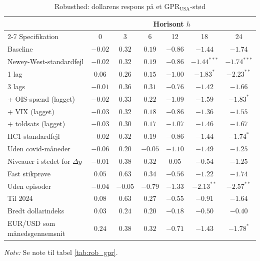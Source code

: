 \begin{table}[H]
\centering
\caption{Robusthed: dollarens respons på et $\text{GPR}_{\text{USA}}$-stød}
\label{tab:rob_gpr_usa}
\begin{threeparttable}
\begin{tabular}{lcccccc}
\toprule
 & \multicolumn{6}{c}{Horisont $h$} \\
\cmidrule(lr){2-7}
Specifikation & 0 & 3 & 6 & 12 & 18 & 24 \\
\midrule
Baseline & $-0.02$ & $0.32$ & $0.19$ & $-0.86$ & $-1.44$ & $-1.74$ \\
Newey-West-standardfejl & $-0.02$ & $0.32$ & $0.19$ & $-0.86$ & $-1.44^{***}$ & $-1.74^{***}$ \\
1 lag & $0.06$ & $0.26$ & $0.15$ & $-1.00$ & $-1.83^{*}$ & $-2.23^{**}$ \\
3 lags & $-0.01$ & $0.36$ & $0.31$ & $-0.76$ & $-1.42$ & $-1.66$ \\
+ OIS-spænd (lagget) & $-0.02$ & $0.33$ & $0.22$ & $-1.09$ & $-1.59$ & $-1.83^{*}$ \\
+ VIX (lagget) & $-0.03$ & $0.32$ & $0.18$ & $-0.86$ & $-1.36$ & $-1.55$ \\
+ toldsats (lagget) & $-0.03$ & $0.30$ & $0.17$ & $-1.07$ & $-1.46$ & $-1.67$ \\
HC1-standardfejl & $-0.02$ & $0.32$ & $0.19$ & $-0.86$ & $-1.44$ & $-1.74^{*}$ \\
Uden covid-måneder & $-0.06$ & $0.20$ & $-0.05$ & $-1.10$ & $-1.49$ & $-1.25$ \\
Niveauer i stedet for $\Delta y$ & $-0.01$ & $0.38$ & $0.32$ & $0.05$ & $-0.54$ & $-1.25$ \\
Fast stikprøve & $0.05$ & $0.63$ & $0.34$ & $-0.56$ & $-1.22$ & $-1.74$ \\
Uden episoder & $-0.04$ & $-0.05$ & $-0.79$ & $-1.33$ & $-2.13^{**}$ & $-2.57^{**}$ \\
Til 2024 & $0.08$ & $0.63$ & $0.27$ & $-0.55$ & $-0.91$ & $-1.64$ \\
Bredt dollarindeks & $0.03$ & $0.24$ & $0.20$ & $-0.18$ & $-0.50$ & $-0.40$ \\
EUR/USD som månedsgennemsnit & $0.24$ & $0.38$ & $0.32$ & $-0.71$ & $-1.43$ & $-1.78^{*}$ \\
\bottomrule
\end{tabular}
\begin{tablenotes}[flushleft]\footnotesize
\item \textit{Note:} Se note til tabel \ref{tab:rob_gpr}.
\end{tablenotes}
\end{threeparttable}
\end{table}
